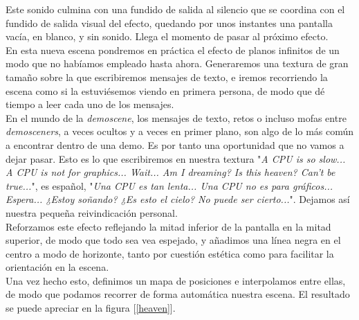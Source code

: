 Este sonido culmina con una fundido de salida al silencio que se coordina con el fundido de salida visual del efecto, quedando por unos instantes una pantalla vacía, en blanco, y sin sonido. Llega el momento de pasar al próximo efecto.\\

En esta nueva escena pondremos en práctica el efecto de planos infinitos de un modo que no habíamos empleado hasta ahora. Generaremos una textura de gran tamaño sobre la que escribiremos mensajes de texto, e iremos recorriendo la escena como si la estuviésemos viendo en primera persona, de modo que dé tiempo a leer cada uno de los mensajes.\\

En el mundo de la \emph{demoscene}, los mensajes de texto, retos o incluso mofas entre \emph{demosceners}, a veces ocultos y a veces en primer plano, son algo de lo más común a encontrar dentro de una demo. Es por tanto una oportunidad que no vamos a dejar pasar. Esto es lo que escribiremos en nuestra textura "\emph{A CPU is so slow... A CPU is not for graphics... Wait... Am I dreaming? Is this heaven? Can't be true...}", es español, "\emph{Una CPU es tan lenta... Una CPU no es para gráficos... Espera... ¿Estoy soñando? ¿Es esto el cielo? No puede ser cierto...}". Dejamos así nuestra pequeña reivindicación personal.\\

Reforzamos este efecto reflejando la mitad inferior de la pantalla en la mitad superior, de modo que todo sea vea espejado, y añadimos una línea negra en el centro a modo de horizonte, tanto por cuestión estética como para facilitar la orientación en la escena.\\

Una vez hecho esto, definimos un mapa de posiciones e interpolamos entre ellas, de modo que podamos recorrer de forma automática nuestra escena. El resultado se puede apreciar en la figura [\ref{heaven}].\\

